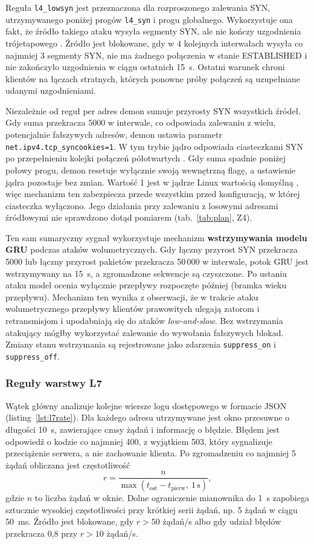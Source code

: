 \documentclass[a4paper,12pt]{article}
\begin{document}
Reguła \texttt{l4\_lowsyn} jest przeznaczona dla rozproszonego zalewania SYN, utrzymywanego poniżej progów \texttt{l4\_syn} i progu globalnego. Wykorzystuje ona fakt, że źródło takiego ataku wysyła segmenty SYN, ale nie kończy uzgodnienia trójetapowego \cite{rfc9293}. Źródło jest blokowane, gdy w 4 kolejnych interwałach wysyła co najmniej 3 segmenty SYN, nie ma żadnego połączenia w stanie ESTABLISHED i nie zakończyło uzgodnienia w ciągu ostatnich 15~s. Ostatni warunek chroni klientów na łączach stratnych, których ponowne próby połączeń są uzupełniane udanymi uzgodnieniami.

Niezależnie od reguł per adres demon sumuje przyrosty SYN wszystkich źródeł. Gdy suma przekracza 5000 w interwale, co odpowiada zalewaniu z wielu, potencjalnie fałszywych adresów, demon ustawia parametr \texttt{net.ipv4.tcp\_syncookies=1}. W tym trybie jądro odpowiada ciasteczkami SYN po przepełnieniu kolejki połączeń półotwartych \cite{rfc4987, linux_syncookies, kernel_ipsysctl}. Gdy suma spadnie poniżej połowy progu, demon resetuje wyłącznie swoją wewnętrzną flagę, a ustawienie jądra pozostaje bez zmian. Wartość 1 jest w jądrze Linux wartością domyślną \cite{kernel_ipsysctl}, więc mechanizm ten zabezpiecza przede wszystkim przed konfiguracją, w której ciasteczka wyłączono. Jego działania przy zalewaniu z losowymi adresami źródłowymi nie sprawdzono dotąd pomiarem (tab.~\ref{tab:plan}, Z4).

Ten sam sumaryczny sygnał wykorzystuje mechanizm \textbf{wstrzymywania modelu GRU} podczas ataków wolumetrycznych. Gdy łączny przyrost SYN przekracza 5000 lub łączny przyrost pakietów przekracza 50\,000 w interwale, potok GRU jest wstrzymywany na 15~s, a zgromadzone sekwencje są czyszczone. Po ustaniu ataku model ocenia wyłącznie przepływy rozpoczęte później (bramka wieku przepływu). Mechanizm ten wynika z obserwacji, że w trakcie ataku wolumetrycznego przepływy klientów prawowitych ulegają zatorom i retransmisjom i upodabniają się do ataków \textit{low-and-slow}. Bez wstrzymania atakujący mógłby wykorzystać zalewanie do wywołania fałszywych blokad. Zmiany stanu wstrzymania są rejestrowane jako zdarzenia \texttt{suppress\_on} i \texttt{suppress\_off}.

\subsubsection{Reguły warstwy L7}\label{sec:impl_l7}
Wątek główny analizuje kolejne wiersze logu dostępowego w formacie JSON (listing~\ref{lst:l7rate}). Dla każdego adresu utrzymywane jest okno przesuwne o długości 10~s, zawierające czasy żądań i informację o błędzie. Błędem jest odpowiedź o kodzie co najmniej 400, z wyjątkiem 503, który sygnalizuje przeciążenie serwera, a nie zachowanie klienta. Po zgromadzeniu co najmniej 5 żądań obliczana jest częstotliwość
\begin{equation}
r = \frac{n}{\max(t_{\mathrm{ost}} - t_{\mathrm{pierw}},\ 1\,\mathrm{s})},
\end{equation}
gdzie $n$ to liczba żądań w oknie. Dolne ograniczenie mianownika do 1~s zapobiega sztucznie wysokiej częstotliwości przy krótkiej serii żądań, np. 5 żądań w ciągu 50~ms. Źródło jest blokowane, gdy $r > 50$ żądań/s albo gdy udział błędów przekracza 0,8 przy $r > 10$ żądań/s.
\end{document}
